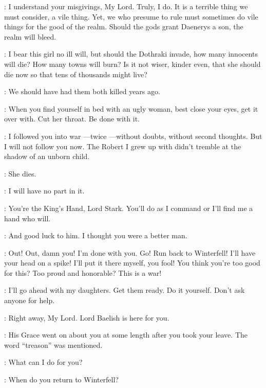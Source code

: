 \VARYS: I understand your misgivings, My Lord. Truly, I do. It is a terrible thing we must consider, a vile thing. Yet, we who presume to rule must sometimes do vile things for the good of the realm. Should the gods grant Daenerys a son, the realm will bleed. 

\PYCELLE: I bear this girl no ill will, but should the Dothraki invade, how many innocents will die? How many towns will burn? Is it not wiser, kinder even, that she should die now so that tens of thousands might live? 

\RENLY: We should have had them both killed years ago. 

\LITTLEFINGER: When you find yourself in bed with an ugly woman, best close your eyes, get it over with. Cut her throat. Be done with it. 

\NED: I followed you into war ---twice ---without doubts, without second thoughts. But I will not follow you now. The Robert I grew up with didn't tremble at the shadow of an unborn child. 

\ROBERT: She dies. 

\NED: I will have no part in it. 

\ROBERT: You're the King's Hand, Lord Stark. You'll do as I command or I'll find me a hand who will. 


\NED: And good luck to him. I thought you were a better man. 

\ROBERT: Out! Out, damn you! I'm done with you.  Go! Run back to Winterfell! I'll have your head on a spike! I'll put it there myself, you fool! You think you're too good for this? Too proud and honorable? This is a war! 



\NED: I'll go ahead with my daughters. Get them ready. Do it yourself. Don't ask anyone for help. 

\JORY: Right away, My Lord. Lord Baelish is here for you. 

\LITTLEFINGER: His Grace went on about you at some length after you took your leave. The word ``treason'' was mentioned. 

\NED: What can I do for you? 

\LITTLEFINGER: When do you return to Winterfell? 

